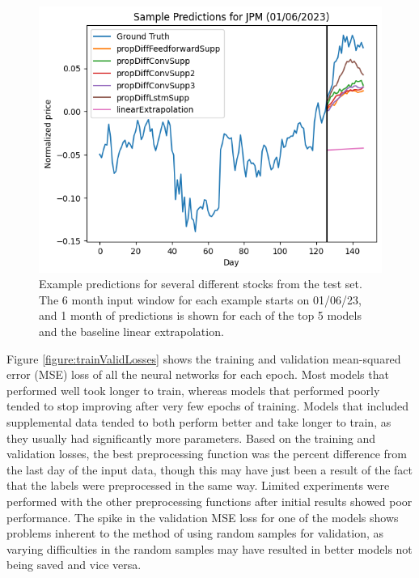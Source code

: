 \documentclass[conference]{IEEEtran}
\begin{document}
\begin{figure}
    \includegraphics[width=\columnwidth]{figures/jpmSample.png}
    \caption{Example predictions for several different stocks from the test set. The 6 month input window for each example starts on 01/06/23, and 1 month of predictions is shown for each of the top 5 models and the baseline linear extrapolation.}
    \label{figure:examplePredictions}
\end{figure}

Figure \ref{figure:trainValidLosses} shows the training and validation mean-squared error (MSE) loss of all the neural networks for each epoch. Most models that performed well took longer to train, whereas models that performed poorly tended to stop improving after very few epochs of training. Models that included supplemental data tended to both perform better and take longer to train, as they usually had significantly more parameters. Based on the training and validation losses, the best preprocessing function was the percent difference from the last day of the input data, though this may have just been a result of the fact that the labels were preprocessed in the same way. Limited experiments were performed with the other preprocessing functions after initial results showed poor performance. The spike in the validation MSE loss for one of the models shows problems inherent to the method of using random samples for validation, as varying difficulties in the random samples may have resulted in better models not being saved and vice versa.
\end{document}
